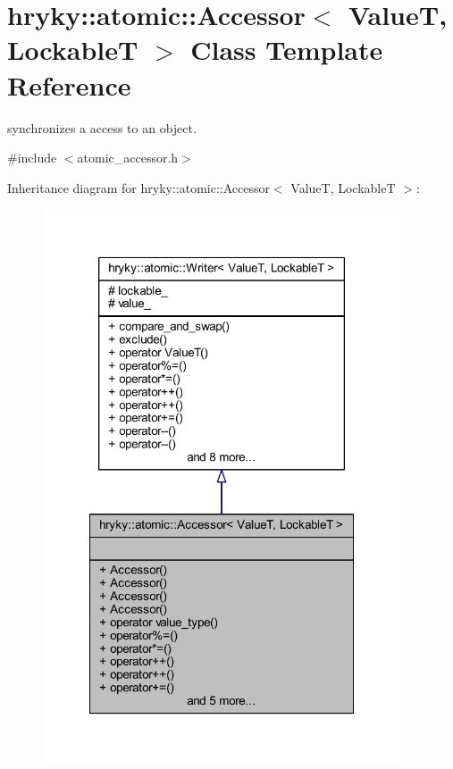 \hypertarget{classhryky_1_1atomic_1_1_accessor}{\section{hryky\-:\-:atomic\-:\-:Accessor$<$ Value\-T, Lockable\-T $>$ Class Template Reference}
\label{classhryky_1_1atomic_1_1_accessor}
}


synchronizes a access to an object.  




{\ttfamily \#include $<$atomic\-\_\-accessor.\-h$>$}



Inheritance diagram for hryky\-:\-:atomic\-:\-:Accessor$<$ Value\-T, Lockable\-T $>$\-:
\nopagebreak
\begin{figure}[H]
\begin{center}
\leavevmode
\includegraphics[width=300pt]{classhryky_1_1atomic_1_1_accessor__inherit__graph}
\end{center}
\end{figure}
